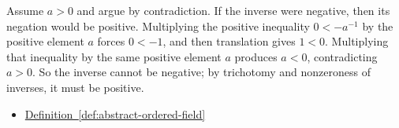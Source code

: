 \begin{remark*}
Assume $a>0$ and argue by contradiction.  If the inverse were negative, then
its negation would be positive.  Multiplying the positive inequality
$0<-a^{-1}$ by the positive element $a$ forces $0<-1$, and then translation
gives $1<0$.  Multiplying that inequality by the same positive element $a$
produces $a<0$, contradicting $a>0$.  So the inverse cannot be negative; by
trichotomy and nonzeroness of inverses, it must be positive.
\end{remark*}

\begin{dependencies}
\begin{itemize}
  \item \hyperref[def:abstract-ordered-field]{Definition~\ref*{def:abstract-ordered-field}}
\end{itemize}
\end{dependencies}

\clearpage
